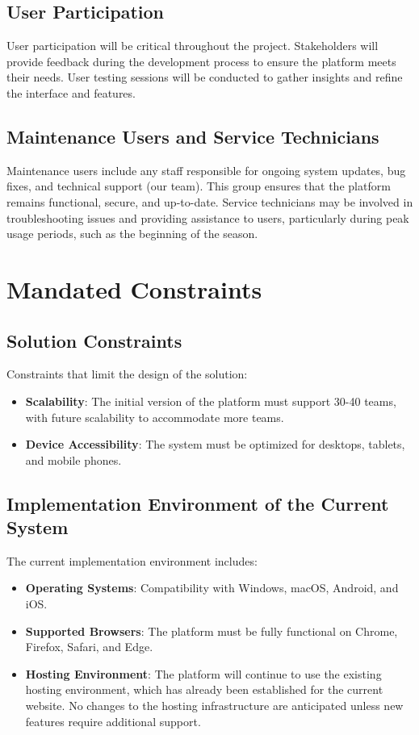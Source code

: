 \documentclass[12pt]{article}
\begin{document}
\subsection{User Participation}
User participation will be critical throughout the project. Stakeholders will provide feedback during the development process to ensure the platform meets their needs. User testing sessions will be conducted to gather insights and refine the interface and features.
\subsection{Maintenance Users and Service Technicians}
Maintenance users include any staff responsible for ongoing system updates, bug fixes, and technical support (our team). This group ensures that the platform remains functional, secure, and up-to-date. Service technicians may be involved in troubleshooting issues and providing assistance to users, particularly during peak usage periods, such as the beginning of the season.

\section{Mandated Constraints}

\subsection{Solution Constraints}
Constraints that limit the design of the solution:
\begin{itemize}
    \item \textbf{Scalability}: The initial version of the platform must support 30-40 teams, with future scalability to accommodate more teams.
    \item \textbf{Device Accessibility}: The system must be optimized for desktops, tablets, and mobile phones.
\end{itemize}

\subsection{Implementation Environment of the Current System}
The current implementation environment includes:
\begin{itemize}
    \item \textbf{Operating Systems}: Compatibility with Windows, macOS, Android, and iOS.
    \item \textbf{Supported Browsers}: The platform must be fully functional on Chrome, Firefox, Safari, and Edge.
    \item \textbf{Hosting Environment}: The platform will continue to use the existing hosting environment, which has already been established for the current website. No changes to the hosting infrastructure are anticipated unless new features require additional support.
\end{itemize}
\end{document}
